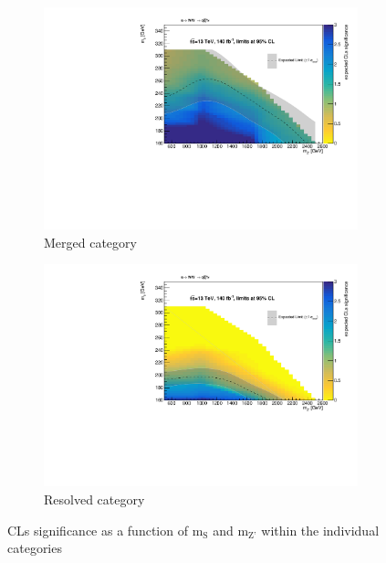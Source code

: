 \documentclass[12pt]{article}
\begin{document}
\begin{figure}[H]
     \centering
     \begin{subfigure}[b]{0.49\textwidth}
         \centering
         \includegraphics[width=\textwidth]{figures/exclude_combined_had_comparison_merged.pdf}
         \caption[]{Merged category}
         \label{fig:merged_sensitivity}
     \end{subfigure}
     \hfill
     \begin{subfigure}[b]{0.49\textwidth}
         \centering
         \includegraphics[width=\textwidth]{figures/exclude_combined_had_comparison_resolved.pdf}
         \caption[]{Resolved category}
         \label{fig:resolved_sensitivity}
     \end{subfigure}
\caption[]{CLs significance as a function of m$_\text{S}$ and m$_\text{Z'}$ within the individual categories}
\label{fig:sensitivity_categories}
\end{figure}
\end{document}
